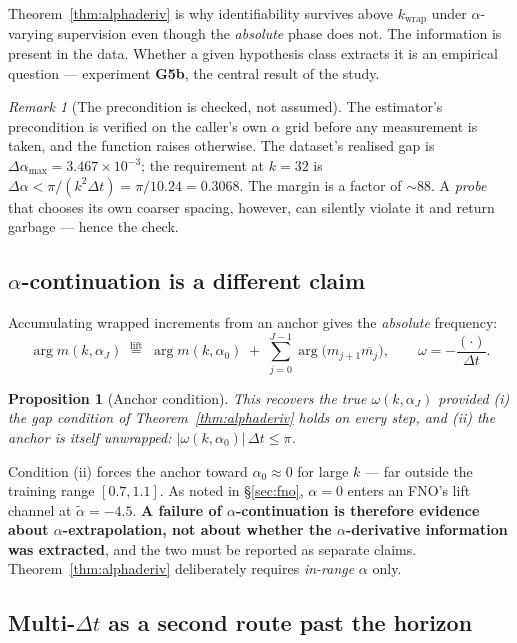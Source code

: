 \documentclass[11pt,a4paper]{article}
\theoremstyle{plain}
\newtheorem{proposition}[theorem]{Proposition}
\theoremstyle{definition}
\theoremstyle{remark}
\newtheorem{remark}[theorem]{Remark}
\newcommand{\dt}{\Delta t}
\newcommand{\kwrap}{k_{\mathrm{wrap}}}
\begin{document}
Theorem~\ref{thm:alphaderiv} is why identifiability survives above $\kwrap$ under
$\alpha$-varying supervision even though the \emph{absolute} phase does not. The
information is present in the data. Whether a given hypothesis class extracts it is an
empirical question --- experiment \textbf{G5b}, the central result of the study.

\begin{remark}[The precondition is checked, not assumed]
The estimator's precondition is verified on the caller's own $\alpha$ grid before any
measurement is taken, and the function raises otherwise. The dataset's realised gap is
$\Delta\alpha_{\max} = 3.467\times10^{-3}$; the requirement at $k=32$ is
$\Delta\alpha < \pi/(k^2\dt) = \pi/10.24 = 0.3068$. The margin is a factor of $\sim$88. A
\emph{probe} that chooses its own coarser spacing, however, can silently violate it and
return garbage --- hence the check.
\end{remark}

\subsection{$\alpha$-continuation is a different claim}
\label{sec:continuation}

Accumulating wrapped increments from an anchor gives the \emph{absolute} frequency:
\[
\arg m(k,\alpha_J) \;\overset{\text{lift}}{=}\; \arg m(k,\alpha_0)
\;+\;\sum_{j=0}^{J-1}\arg\bigl(m_{j+1}\overline{m_j}\bigr),
\qquad \omega = -\frac{(\cdot)}{\dt}.
\]

\begin{proposition}[Anchor condition]
\label{prop:anchor}
This recovers the true $\omega(k,\alpha_J)$ provided (i) the gap condition of
Theorem~\ref{thm:alphaderiv} holds on every step, and (ii) the anchor is itself unwrapped:
$|\omega(k,\alpha_0)|\,\dt \le \pi$.
\end{proposition}

Condition (ii) forces the anchor toward $\alpha_0\approx 0$ for large $k$ --- far outside
the training range $[0.7,1.1]$. As noted in \S\ref{sec:fno}, $\alpha = 0$ enters an FNO's
lift channel at $\tilde\alpha=-4.5$. \textbf{A failure of $\alpha$-continuation is
therefore evidence about $\alpha$-extrapolation, not about whether the
$\alpha$-derivative information was extracted}, and the two must be reported as separate
claims. Theorem~\ref{thm:alphaderiv} deliberately requires \emph{in-range} $\alpha$ only.

\subsection{Multi-$\dt$ as a second route past the horizon}
\end{document}
